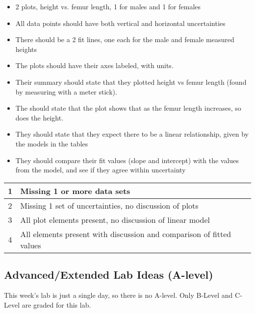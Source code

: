 \documentclass[fleqn,letterpaper]{article}
\begin{document}
\begin{itemize}
 \item{2 plots, height vs. femur length, 1 for males and 1 for females}
 \item{All data points should have both vertical and horizontal uncertainties}
 \item{There should be a 2 fit lines, one each for the male and female measured heights}
 \item{The plots should have their axes labeled, with units.}
 \item{Their summary should state that they plotted height vs femur length (found by measuring with a meter stick).}
 \item{The should state that the plot shows that as the femur length increases, so does the height.}
 \item{They should state that they expect there to be a linear relationship, given by the models in the tables}
 \item{They should compare their fit values (slope and intercept) with the values from the model, and see if they agree within uncertainty}
\end{itemize}

\begin{center}
\begin{tabular}{|c|l|} \hline \hline
1 & Missing 1 or more data sets \\ \hline
2 & Missing 1 set of uncertainties, no discussion of plots \\ \hline
3 & All plot elements present, no discussion of linear model\\ \hline
4 & All elements present with discussion and comparison of fitted values \\  \hline \hline
\end{tabular}
\end{center}


\subsection*{Advanced/Extended Lab Ideas (A-level)}

This week's lab is just a single day, so there is no A-level.  Only B-Level and C-Level are graded for this lab.

\label{LastPage}
\end{document}
